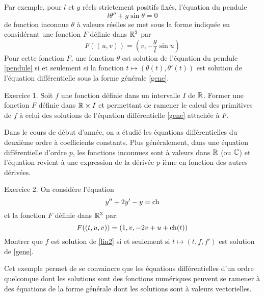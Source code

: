 Par exemple, pour $l$ et $g$ réels strictement positifs fixés, l'équation du pendule
\begin{equation}
  l\theta'' + g \sin \theta = 0
  \label{pendule}
\end{equation}
de fonction inconnue $\theta$ à valeurs réelles se met sous la forme indiquée en considérant une fonction $F$ définie dans $\mathbb{R}^2$ par 
\begin{displaymath}
  F((u,v)) = (v,-\frac{g}{l}\sin u)
\end{displaymath}
Pour cette fonction $F$, une fonction $\theta$ est solution de l'équation du pendule \eqref{pendule} si et seulement si la fonction $t\mapsto (\theta(t),\theta'(t))$ est solution de l'équation différentielle sous la forme générale \eqref{gene}.

Exercice 1. Soit $f$ une fonction définie dans un intervalle $I$ de $\mathbb{R}$. Former une fonction $F$ définie dans $\mathbb{R}\times I$ et permettant de ramener le calcul des primitives de $f$ à celui des solutions de l'équation différentielle \eqref{gene} attachée à $F$.

Dans le cours de début d'année, on a étudié les équations différentielles du deuxième ordre à coefficients constants. Plus généralement, dans une équation différentielle d'ordre $p$, les fonctions inconnues sont à valeurs dans $\mathbb{R}$ (ou $\mathbb{C}$) et l'équation revient à une expression de la dérivée $p$-ième en fonction des autres dérivées.

Exercice 2. On considère l'équation
\begin{equation}
  y'' + 2y' - y = \mathop{\mathrm{ch}}
  \label{lin2}
\end{equation}
et la fonction $F$ définie dans $\mathbb{R}^3$ par:
\begin{displaymath}
  F((t,u,v)) = (1,v,-2v+u+\mathop{\mathrm{ch}}(t))
\end{displaymath}
Montrer que $f$ est solution de \eqref{lin2} si et seulement si $t\mapsto(t,f,f')$ est solution de \eqref{gene}.

Cet exemple permet de se convaincre que les équations différentielles d'un ordre quelconque dont les solutions sont des fonctions numériques peuvent se ramener à des équations de la forme générale dont les solutions sont à valeurs vectorielles.

